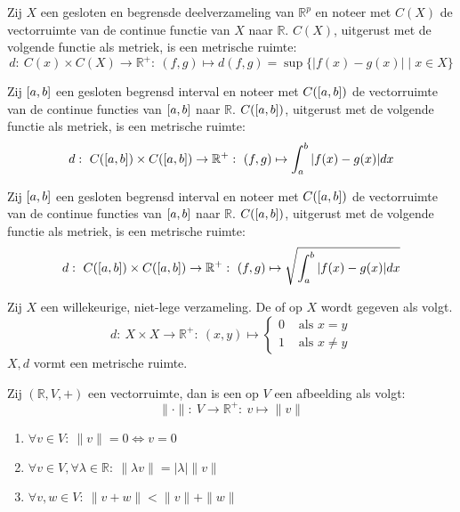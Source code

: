 \documentclass[main.tex]{subfiles}
\begin{document}
\begin{vb}
  Zij $X$ een gesloten en begrensde deelverzameling van $\mathbb{R}^{p}$ en noteer met $C(X)$ de vectorruimte van de continue functie van $X$ naar $\mathbb{R}$.
  $C(X)$, uitgerust met de volgende functie als metriek, is een metrische ruimte:
  \[ d:\ C(x)\times C(X)\rightarrow \mathbb{R}^{+}:\ (f,g) \mapsto d(f,g) = \sup \{ |f(x)-g(x)| \mid x \in X \} \]
\end{vb}

\begin{vb}
  Zij $\interval{a}{b}$ een gesloten begrensd interval en noteer met $C(\interval{a}{b})$ de vectorruimte van de continue functies van $\interval{a}{b}$ naar $\mathbb{R}$.
  $C(\interval{a}{b})$, uitgerust met de volgende functie als metriek, is een metrische ruimte:
  \[ d:\ C(\interval{a}{b})\times C(\interval{a}{b}) \rightarrow \mathbb{R}^{+}:\ (f,g) \mapsto \int_{a}^{b}|f(x)-g(x)|dx \]
\end{vb}

\begin{vb}
  Zij $\interval{a}{b}$ een gesloten begrensd interval en noteer met $C(\interval{a}{b})$ de vectorruimte van de continue functies van $\interval{a}{b}$ naar $\mathbb{R}$.
  $C(\interval{a}{b})$, uitgerust met de volgende functie als metriek, is een metrische ruimte:
  \[ d:\ C(\interval{a}{b})\times C(\interval{a}{b}) \rightarrow \mathbb{R}^{+}:\ (f,g) \mapsto \sqrt{\int_{a}^{b}|f(x)-g(x)|dx} \]
\end{vb}

\begin{vb}
  Zij $X$ een willekeurige, niet-lege verzameling.
  De  of  op $X$ wordt gegeven als volgt.
  \[
  d:\ X \times X \rightarrow \mathbb{R}^{+}:\ (x,y) \mapsto
  \begin{cases}
    0 &\text{ als } x = y\\
    1 &\text{ als } x \neq y
  \end{cases}
  \]
  $X,d$ vormt een metrische ruimte.
\end{vb}


\begin{de}
  Zij $(\mathbb{R},V,+)$ een vectorruimte, dan is een  op $V$ een afbeelding als volgt:
  \[ \|\cdot\|:\ V \rightarrow \mathbb{R}^{+}:\ v \mapsto \|v\| \]
  \begin{enumerate}
  \item $\forall v\in V:\ \|v\| = 0 \Leftrightarrow v=0$
  \item $\forall v\in V, \forall \lambda \in \mathbb{R}:\ \|\lambda v\| = |\lambda|\|v\|$
  \item $\forall v,w\in V:\ \|v+w\| < \|v\| + \|w\|$
  \end{enumerate}
\end{de}
\end{document}
